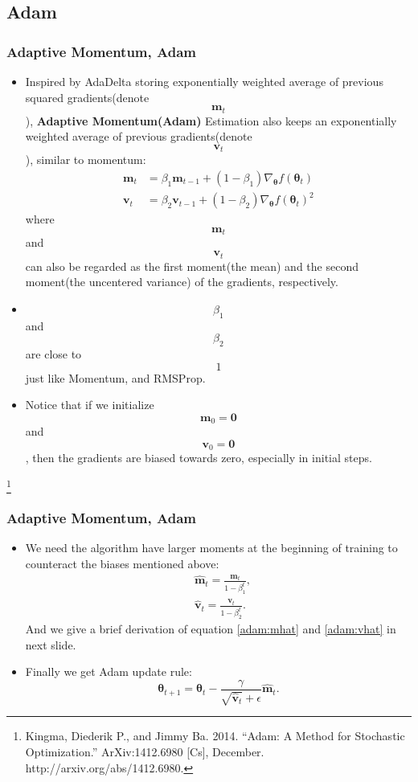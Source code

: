 \documentclass[10pt]{beamer}
\theoremstyle{mystyle}
\def\bb#1{\mathbf{#1}}
\newcommand{\bst}{\boldsymbol\theta}
\newcommand\blfootnote[1]{%
  \begingroup
  \renewcommand\thefootnote{}\footnote[frame]{#1}%
  \addtocounter{footnote}{-1}%
  \endgroup
}
\theoremstyle{mystyle}
\begin{document}
\subsection{Adam}
\begin{frame}
	\frametitle{Adaptive Momentum, Adam}
	\begin{itemize}
		\item Inspired by AdaDelta storing exponentially weighted average of previous squared gradients(denote $$ \bb m_t $$), {\bf Adaptive Momentum(Adam)} Estimation also keeps an exponentially weighted average of previous gradients(denote $$ \bb v_t $$), similar to momentum:
		\begin{align}
			\bb m_t &= \beta_1\bb m_{t-1}+(1-\beta_1)\nabla_{\bst}f(\bst_t) \\
			\bb v_t &= \beta_2\bb v_{t-1}+(1-\beta_2)\nabla_{\bst}f(\bst_t)^2 
		\end{align}
		where $$ \bb m_t $$ and $$ \bb v_t $$ can also be regarded as the first moment(the mean) and the second moment(the uncentered variance) of the gradients, respectively. 
		\item $$ \beta_1 $$ and $$ \beta_2 $$ are close to $$ 1 $$ just like Momentum, and RMSProp.
		\item Notice that if we initialize $$ \bb m_0=\bb0 $$ and $$ \bb v_0=\bb0 $$, then the gradients are biased towards zero, especially in initial steps.
	\end{itemize}
	
	\blfootnote{Kingma, Diederik P., and Jimmy Ba. 2014. “Adam: A Method for Stochastic Optimization.” ArXiv:1412.6980 [Cs], December. http://arxiv.org/abs/1412.6980.}
\end{frame}

\begin{frame}
	\frametitle{Adaptive Momentum, Adam}
	\begin{itemize}
		\item We need the algorithm have larger moments at the beginning of training to counteract the biases mentioned above:
		\begin{align}\label{adam:mhat}
			&\hat{\bb m}_t=\frac{\bb m_t}{1 - \beta_1^t}, \\ \label{adam:vhat}
			&\hat{\bb v}_t=\frac{\bb v_t}{1 - \beta_2^t}.
		\end{align}
		And we give a brief derivation of equation \eqref{adam:mhat} and \eqref{adam:vhat} in next slide.
		\item Finally we get Adam update rule:
		\begin{equation}
			\bst_{t+1}=\bst_t-\frac{\gamma}{\sqrt{\hat{\bb v}_t}+\epsilon}\hat{\bb m}_t.
		\end{equation}
	\end{itemize}
\end{frame}
\end{document}

